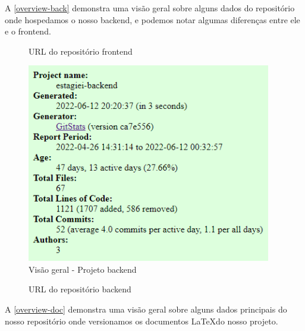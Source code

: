 A \autoref{overview-back} demonstra uma visão geral sobre alguns dados do repositório onde hospedamos o nosso backend, e podemos notar algumas diferenças entre ele e o \gls{frontend}.

\begin{figure}[htb]
	\caption{\label{qr-url-front}URL do repositório \gls{frontend}}
	\begin{center}
	\end{center}
\end{figure}

\begin{figure}[H]
	\centering
	\caption{\label{overview-back}Visão geral - Projeto \gls{backend}}
	\includegraphics[width=0.95\textwidth]{../imagens/stats/overview-backend.png}
\end{figure}

\begin{figure}[htb]
	\caption{\label{qr-url-back}URL do repositório \gls{backend}}
	\begin{center}
	\end{center}
\end{figure}

A \autoref{overview-doc} demonstra uma visão geral sobre alguns dados principais do nosso repositório onde versionamos os documentos \LaTeX do nosso projeto.


